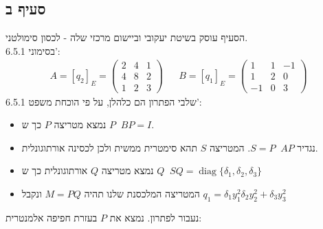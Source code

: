 \documentclass{article}
\DeclareMathOperator{\adj}{^\ast}
\DeclareMathOperator{\tra}{^t}
\DeclareMathOperator{\diag}{diag}
\begin{document}
\subsection*{סעיף ב}

הסעיף עוסק בשיטת יעקובי וביישום מרכזי שלה - לכסון סימולטני. \\
בסימוני 6.5.1':
\begin{align*}
    A=[q_2]_E=\begin{pmatrix}
                  2 & 4 & 1 \\
                  4 & 8 & 2 \\
                  1 & 2 & 3
              \end{pmatrix} &  & B=[q_1]_E=\begin{pmatrix}
                                               1  & 1 & -1 \\
                                               1  & 2 & 0  \\
                                               -1 & 0 & 3
                                           \end{pmatrix}
\end{align*}
שלבי הפתרון הם כלהלן, על פי הוכחת משפט 6.5.1':
\begin{itemize}
    \item נמצא מטריצה $P$ כך ש $P\tra B P=I$.
    \item נגדיר $S=P\tra A P$. המטריצה $S$ תהא סימטרית ממשית ולכן לכסינה אורתוגונלית.
    \item נמצא מטריצה $Q$ אורתוגונלית כך ש $Q \adj S Q=\diag\{ \delta_1, \delta_2, \delta_3 \}$
    \item המטריצה המלכסנת שלנו תהיה $M=PQ$ ונקבל $q_1=\delta_1y_1^2\delta_2y_2^2+\delta_3y_3^2$
\end{itemize}
נעבור לפתרון. נמצא את $P$ בעזרת חפיפה אלמנטרית:
\end{document}
